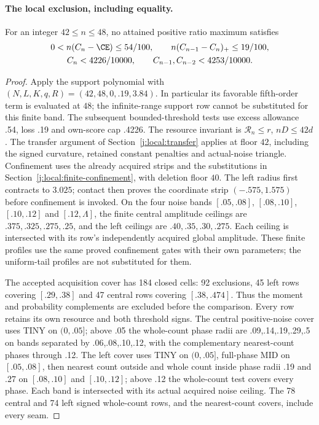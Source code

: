 \paragraph{The local exclusion, including equality.}\label{j:local:comparison}
\begin{proposition}\label{j:local:finite42}
For an integer $42\le n\le48$, no attained positive ratio maximum satisfies
\begin{gather*}
 0<n(C_n-\CE)\le54/100,\qquad n(C_{n-1}-C_n)_+\le19/100,\\
 C_n<4226/10000,\qquad C_{n-1},C_{n-2}<4253/10000.
\end{gather*}
\end{proposition}
\begin{proof}
Apply the support polynomial with $(N,L,K,q,R)=(42,48,0,.19,3.84)$.
In particular its favorable fifth-order term is evaluated at $48$; the
infinite-range support row cannot be substituted for this finite band.
The subsequent bounded-threshold tests use excess allowance .54, loss .19
and own-score cap .4226. The resource invariant is
$\mathcal R_n\le r$, $nD\le42d$. The transfer argument of
Section~\ref{j:local:transfer} applies at floor $42$, including the signed
curvature, retained constant penalties and actual-noise triangle.
Confinement uses the already acquired strips and the substitutions in
Section~\ref{j:local:finite-confinement}, with deletion floor $40$.
The left radius first contracts to $3.025$; contact then proves the
coordinate strip $(-.575,1.575)$ before confinement is invoked.
On the four noise bands $[.05,.08]$, $[.08,.10]$, $[.10,.12]$ and
$[.12,\Lambda]$, the finite central amplitude ceilings are
$.375,.325,.275,.25$, and the left ceilings are $.40,.35,.30,.275$.
Each ceiling is intersected with its row's independently acquired
global amplitude. These finite profiles use the same proved
confinement gates with their own parameters; the uniform-tail profiles
are not substituted for them.

The accepted acquisition cover has 184 closed cells: 92 exclusions,
45 left rows covering $[.29,.38]$ and 47 central rows covering
$[.38,.474]$. Thus the moment and probability complements are excluded
before the comparison. Every row retains its own resource and both
threshold signs. The central positive-noise cover uses TINY on $(0,.05]$;
above .05 the whole-count phase radii are .09,.14,.19,.29,.5 on bands
separated by .06,.08,.10,.12, with the complementary nearest-count
phases through .12. The left cover uses TINY on $(0,.05]$, full-phase
MID on $[.05,.08]$, then nearest count outside and whole count inside
phase radii .19 and .27 on $[.08,.10]$ and $[.10,.12]$; above .12 the
whole-count test covers every phase. Each band is intersected with its
actual acquired noise ceiling. The 78 central and 74 left signed
whole-count rows, and the nearest-count covers, include every seam.


\end{proof}
